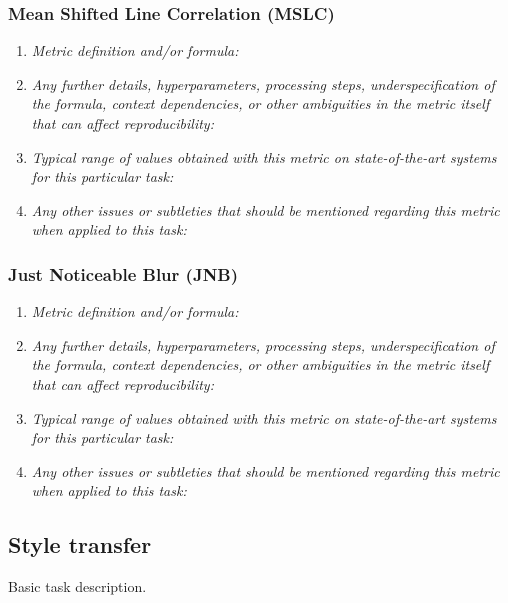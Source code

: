 \documentclass[a4paper,11pt]{article}
\begin{document}
        \subsubsection{Mean Shifted Line Correlation (MSLC)}
            \begin{enumerate}[label=\alph*.]
                \item \textit{Metric definition and/or formula:}
                \bigskip
                \item \textit{Any further details, hyperparameters, processing steps, underspecification of the formula, context dependencies, or other ambiguities in the metric itself that can affect reproducibility:}
                \bigskip
                \item \textit{Typical range of values obtained with this metric on state-of-the-art systems for this particular task:}
                \bigskip
                \item \textit{Any other issues or subtleties that should be mentioned regarding this metric when applied to this task:}
                \bigskip
            \end{enumerate}
        \subsubsection{Just Noticeable Blur (JNB)}
            \begin{enumerate}[label=\alph*.]
                \item \textit{Metric definition and/or formula:}
                \bigskip
                \item \textit{Any further details, hyperparameters, processing steps, underspecification of the formula, context dependencies, or other ambiguities in the metric itself that can affect reproducibility:}
                \bigskip
                \item \textit{Typical range of values obtained with this metric on state-of-the-art systems for this particular task:}
                \bigskip
                \item \textit{Any other issues or subtleties that should be mentioned regarding this metric when applied to this task:}
                \bigskip
            \end{enumerate}

    \subsection{Style transfer}
        Basic task description.
\end{document}
